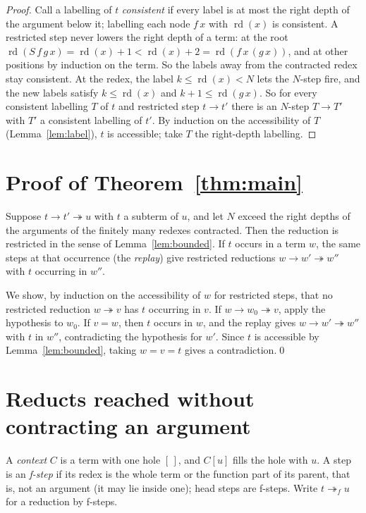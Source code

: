 \documentclass[11pt]{amsart}
\newcommand{\red}{\twoheadrightarrow}
\newcommand{\rd}{\operatorname{rd}}
\begin{document}
\begin{proof}
Call a labelling of $t$ \emph{consistent} if every label is at most the right depth of the argument
below it; labelling each node $f\,x$ with $\rd(x)$ is consistent. A restricted step never lowers the
right depth of a term: at the root
$\rd(S\,f\,g\,x)=\rd(x)+1<\rd(x)+2=\rd(f\,x\,(g\,x))$, and at other positions by induction on
the term. So the labels away from the contracted redex stay consistent. At the redex, the label
$k\le\rd(x)<N$ lets the $N$-step fire, and
the new labels satisfy $k\le\rd(x)$ and $k+1\le\rd(g\,x)$. So for every consistent labelling $T$ of $t$ and restricted step $t\to t'$ there is an
$N$-step $T\to T'$ with $T'$ a consistent labelling of $t'$. By induction on the accessibility of
$T$ (Lemma~\ref{lem:label}), $t$ is accessible; take $T$ the right-depth labelling.
\end{proof}

\section{Proof of Theorem~\ref{thm:main}}

Suppose $t\to t'\red u$ with $t$ a subterm of $u$, and let $N$ exceed the right depths of the
arguments of the finitely many redexes contracted. Then the reduction is restricted in the sense of
Lemma~\ref{lem:bounded}. If $t$ occurs in a term $w$, the same steps at that occurrence (the
\emph{replay}) give
restricted reductions $w\to w'\red w''$ with $t$ occurring in $w''$.

We show, by induction on the accessibility of $w$ for restricted steps, that no restricted
reduction $w\red v$ has $t$ occurring in $v$. If $w\to w_0\red v$, apply the hypothesis to $w_0$. If
$v=w$, then $t$ occurs in $w$, and the replay gives $w\to w'\red w''$ with $t$ in $w''$, contradicting the
hypothesis for $w'$. Since $t$ is accessible by Lemma~\ref{lem:bounded}, taking $w=v=t$ gives a
contradiction.\qed

\section{Reducts reached without contracting an argument}

A \emph{context} $C$ is a term with one hole $[\,]$, and $C[u]$ fills the hole with $u$. A step is
an \emph{f-step} if its redex is the whole term or the function part of its parent, that is, not an
argument (it may lie inside one); head steps are f-steps. Write $t\red_f u$ for a reduction by f-steps.
\end{document}
